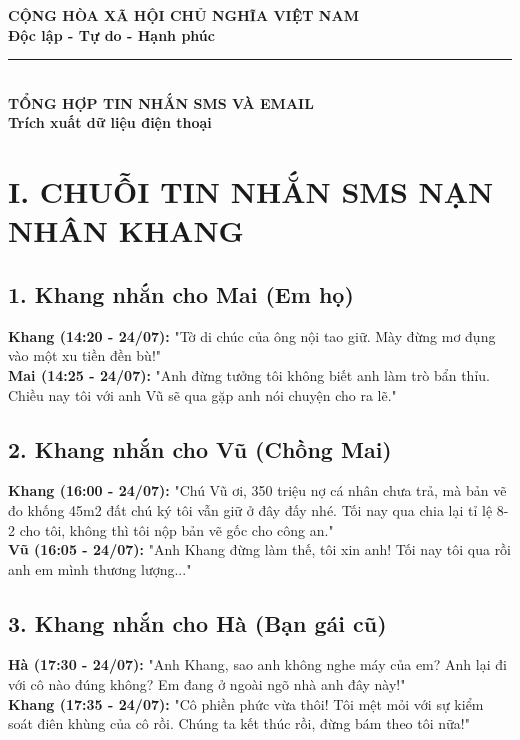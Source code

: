 \documentclass[12pt,a4paper]{article}
\begin{document}
\begin{center}
    \textbf{\Large CỘNG HÒA XÃ HỘI CHỦ NGHĨA VIỆT NAM}\\
    \textbf{\large Độc lập - Tự do - Hạnh phúc}\\
    \rule{8cm}{0.5pt}\\[0.5cm]
    
    \textbf{\LARGE TỔNG HỢP TIN NHẮN SMS VÀ EMAIL}\\
    \textbf{Trích xuất dữ liệu điện thoại}
\end{center}

\vspace{0.3cm}

\section*{I. CHUỖI TIN NHẮN SMS NẠN NHÂN KHANG}

\subsection*{1. Khang nhắn cho Mai (Em họ)}
\begin{tcolorbox}[colback=gray!5!white,colframe=black!75!black]
\textbf{Khang (14:20 - 24/07):} "Tờ di chúc của ông nội tao giữ. Mày đừng mơ đụng vào một xu tiền đền bù!"\\
\textbf{Mai (14:25 - 24/07):} "Anh đừng tưởng tôi không biết anh làm trò bẩn thỉu. Chiều nay tôi với anh Vũ sẽ qua gặp anh nói chuyện cho ra lẽ."
\end{tcolorbox}

\subsection*{2. Khang nhắn cho Vũ (Chồng Mai)}
\begin{tcolorbox}[colback=gray!5!white,colframe=black!75!black]
\textbf{Khang (16:00 - 24/07):} "Chú Vũ ơi, 350 triệu nợ cá nhân chưa trả, mà bản vẽ đo khống 45m2 đất chú ký tôi vẫn giữ ở đây đấy nhé. Tối nay qua chia lại tỉ lệ 8-2 cho tôi, không thì tôi nộp bản vẽ gốc cho công an."\\
\textbf{Vũ (16:05 - 24/07):} "Anh Khang đừng làm thế, tôi xin anh! Tối nay tôi qua rồi anh em mình thương lượng..."
\end{tcolorbox}

\subsection*{3. Khang nhắn cho Hà (Bạn gái cũ)}
\begin{tcolorbox}[colback=gray!5!white,colframe=black!75!black]
\textbf{Hà (17:30 - 24/07):} "Anh Khang, sao anh không nghe máy của em? Anh lại đi với cô nào đúng không? Em đang ở ngoài ngõ nhà anh đây này!"\\
\textbf{Khang (17:35 - 24/07):} "Cô phiền phức vừa thôi! Tôi mệt mỏi với sự kiểm soát điên khùng của cô rồi. Chúng ta kết thúc rồi, đừng bám theo tôi nữa!"
\end{tcolorbox}
\end{document}
